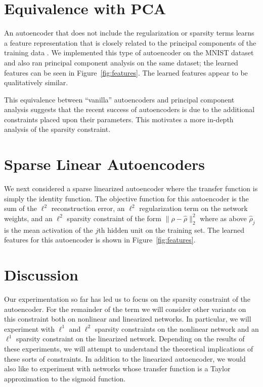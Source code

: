 \documentclass[twocolumn]{article}
\begin{document}
\vspace{-1.1pc}
\section{Equivalence with PCA}
An autoencoder that does not include the regularization or sparsity terms learns a feature
representation that is closely related to the principal components of the training data
\cite{bourlard1988auto}. We implemented this type of autoencoder on the MNIST dataset and
also ran principal component analysis on the same dataset; the learned features can be seen
in Figure~\ref{fig:features}. The learned features appear to be qualitatively similar.

This equivalence between ``vanilla'' autoencoders and principal component analysis suggests
that the recent success of autoencoders is due to the additional constraints placed upon
their parameters. This motivates a more in-depth analysis of the sparsity constraint.

\vspace{-1pc}
\section{Sparse Linear Autoencoders}
We next considered a sparse linearized autoencoder where the transfer function is simply the identity
function. The objective function for this autoencoder is the sum of the $\ell^2$ reconstruction error,
an $\ell^2$ regularization term on the network weights, and an $\ell^2$ sparsity constraint of the form
$\|\rho-\hat\rho\|_2^2$ where as above $\hat\rho_j$ is the mean activation of the $j$th hidden unit
on the training set. The learned features for this autoencoder is shown in Figure~\ref{fig:features}.

\section{Discussion}
Our experimentation so far has led us to focus on the sparsity constraint of the autoencoder.
For the remainder of the term we will consider other variants on this constraint both on
nonlinear and linearized networks. In particular, we will experiment with $\ell^1$ and $\ell^2$
sparsity constraints on the nonlinear network and an $\ell^1$ sparsity constraint on the
linearized network. Depending on the results of these experiments, we will attempt to understand
the theoretical implications of these sorts of constraints. In addition to the linearized
autoencoder, we would also like to experiment with networks whose transfer function is a Taylor
approximation to the sigmoid function.
\end{document}
